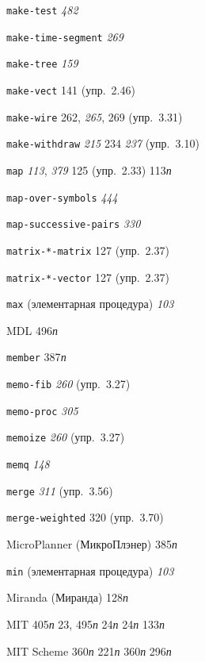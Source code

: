 \begin{theindex}
\item {\texttt{make-test}} {\it 482}
\item {\texttt{make-time-segment}} {\it 269}
\item {\texttt{make-tree}} {\it 159}
\item {\texttt{make-vect}} 141 (упр.~2.46)
\item {\texttt{make-wire}} 262, {\it 265}, 269 (упр.~3.31)
\item {\texttt{make-withdraw}} {\it 215}
   234
   {\it 237} (упр.~3.10)
\item {\texttt{map}} {\it 113}, {\it 379}
   125 (упр.~2.33)
   113{\it п}
\item {\texttt{map-over-symbols}} {\it 444}
\item {\texttt{map-successive-pairs}} {\it 330}
\item {\texttt{matrix-*-matrix}} 127 (упр.~2.37)
\item {\texttt{matrix-*-vector}} 127 (упр.~2.37)
\item {\texttt{max} (элементарная процедура)} {\it 103}
\item {MDL} 496{\it п}
\item {\texttt{member}} 387{\it п}
\item {\texttt{memo-fib}} {\it 260} (упр.~3.27)
\item {\texttt{memo-proc}} {\it 305}
\item {\texttt{memoize}} {\it 260} (упр.~3.27)
\item {\texttt{memq}} {\it 148}
\item {\texttt{merge}} {\it 311} (упр.~3.56)
\item {\texttt{merge-weighted}} 320 (упр.~3.70)
\item {MicroPlanner (МикроПлэнер)} 385{\it п}
\item {\texttt{min} (элементарная процедура)} {\it 103}
\item {Miranda (Миранда)} 128{\it п}
\item {MIT} 405{\it п}
   23, 495{\it п}
   24{\it п}
   24{\it п}
   133{\it п}
\item {MIT Scheme}
   360{\it п}
   221{\it п}
   360{\it п}
   296{\it п}

\end{theindex}
